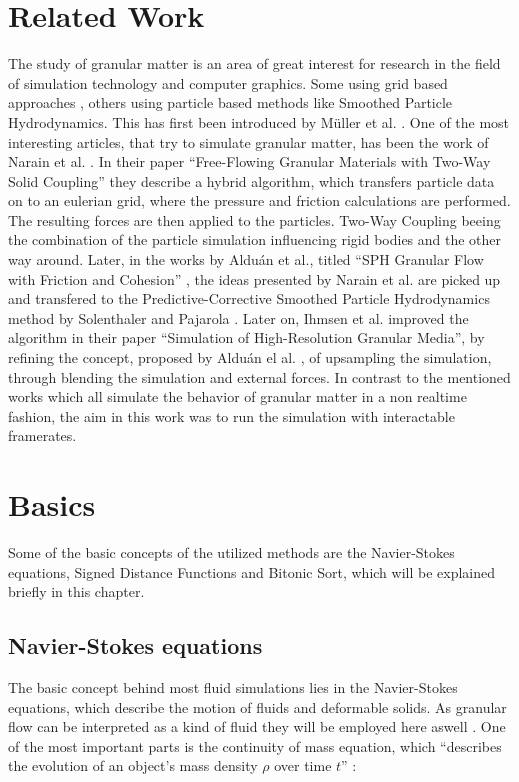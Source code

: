 \documentclass[intern]{cgMA}
\begin{document}
    \section{Related Work}\label{sec:related}
    The study of granular matter is an area of great interest for research in the field of simulation technology and computer graphics. Some using grid based approaches \cite{10.1145/1866158.1866195}, others using particle based methods like Smoothed Particle Hydrodynamics. This has first been introduced by Müller et al. \cite{10.5555/846276.846298}. 
    One of the most interesting articles, that try to simulate granular matter, has been the work of Narain et al. \cite{10.1145/1866158.1866195}. In their paper \enquote{Free-Flowing Granular Materials with Two-Way Solid Coupling}\cite{10.1145/1866158.1866195} they describe a hybrid algorithm, which transfers particle data on to an eulerian grid, where the pressure and friction calculations are performed. The resulting forces are then applied to the particles. Two-Way Coupling beeing the combination of the particle simulation influencing rigid bodies and the other way around. 
    Later, in the works by Alduán et al., titled \enquote{SPH Granular Flow with Friction and Cohesion} \cite{10.1145/2019406.2019410}, the ideas presented by Narain et al. \cite{10.1145/1866158.1866195} are picked up and transfered to the Predictive-Corrective Smoothed Particle Hydrodynamics method by Solenthaler and Pajarola \cite{10.1145/1576246.1531346}. Later on, Ihmsen et al. \cite{10.2312:PE:vriphys:vriphys12:053-060} improved the algorithm in their paper \enquote{Simulation of High-Resolution Granular Media}, by refining the concept, proposed by Alduán el al. \cite{10.2312:LocalChapterEvents:CEIG:CEIG09:011-018}, of upsampling the simulation, through blending the simulation and external forces.
    In contrast to the mentioned works which all simulate the behavior of granular matter in a non realtime fashion, the aim in this work was to run the simulation with interactable framerates.
    \pagebreak
    
    \section{Basics}\label{sec:basics}
    Some of the basic concepts of the utilized methods are the Navier-Stokes equations, Signed Distance Functions and Bitonic Sort, which will be explained briefly in this chapter.

    \subsection{Navier-Stokes equations}
    The basic concept behind most fluid simulations lies in the Navier-Stokes equations, which describe the motion of fluids and deformable solids. As granular flow can be interpreted as a kind of fluid they will be employed here aswell \cite{10.2312:PE:vriphys:vriphys12:053-060}. One of the most important parts is the continuity of mass equation, which \enquote{describes the evolution of an object's mass density $\rho$ over time $t$} \cite{survey_on_sph}:
    
\end{document}
